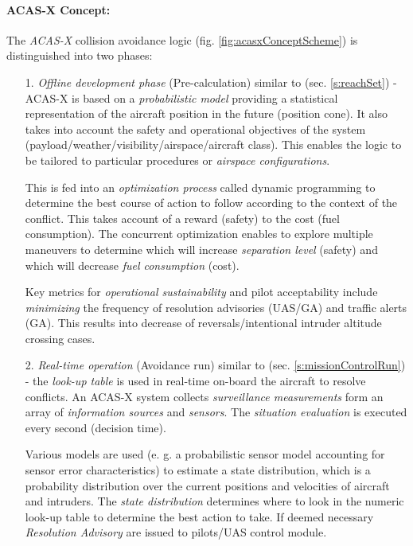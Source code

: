 \paragraph{ACAS-X Concept:} The \emph{ACAS-X} collision avoidance logic (fig. \ref{fig:acasxConceptScheme}) is distinguished into two phases:
\begin{itemize}
    \item[1.] \emph{Offline development phase} (Pre-calculation) similar to (sec. \ref{s:reachSet}) - ACAS-X is based on a \emph{probabilistic model} providing a statistical representation of the aircraft position in the future (position cone). It also takes into account the safety and operational objectives of the system (payload/weather/visibility/airspace/aircraft class). This enables the logic to be tailored to particular procedures or \emph{airspace configurations}.
    
    This is fed into an \emph{optimization process} called dynamic programming to determine the best course of action to follow according to the context of the conflict. This takes account of a reward (safety) to the cost (fuel consumption). The concurrent optimization enables to explore multiple maneuvers to determine which will increase \emph{separation level} (safety) and which will decrease \emph{fuel consumption} (cost).
    
    Key metrics for \emph{operational sustainability} and pilot acceptability include \emph{minimizing} the frequency of resolution advisories (UAS/GA) and traffic alerts (GA). This results into decrease of reversals/intentional intruder altitude crossing cases.
    
    \item[2.] \emph{Real-time operation} (Avoidance run) similar to (sec. \ref{s:missionControlRun}) - the \emph{look-up table} is used in real-time on-board the aircraft to resolve conflicts. An ACAS-X system collects \emph{surveillance measurements} form an array of \emph{information sources} and \emph{sensors}. The \emph{situation evaluation} is executed every second (decision time).
    
    Various models are used (e. g. a probabilistic sensor model accounting for sensor error characteristics) to estimate a state distribution, which is a probability distribution over the current positions and velocities of aircraft and intruders. The \emph{state distribution} determines where to look in the numeric look-up table to determine the best action to take. If deemed necessary \emph{Resolution Advisory} are issued to pilots/UAS control module.
    
\end{itemize}

